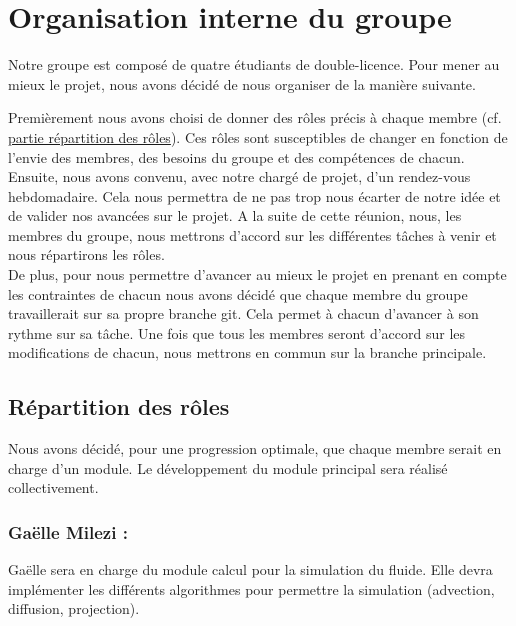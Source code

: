 \documentclass{article}
\begin{document}
   

   

   
   
   \section{Organisation interne du groupe}

   Notre groupe est composé de quatre étudiants de double-licence. Pour mener au mieux le projet, 
   nous avons décidé de nous organiser de la manière suivante.

   Premièrement nous avons choisi de donner des rôles précis à chaque membre 
   (cf. \hyperref[partieroles]{partie répartition des rôles}). Ces rôles sont susceptibles
   de changer en fonction de l'envie des membres, des besoins du groupe et des compétences de chacun. \\
   Ensuite, nous avons convenu, avec notre chargé de projet, d'un rendez-vous hebdomadaire. Cela nous 
   permettra de ne pas trop nous écarter de notre idée et de valider nos avancées sur le projet.
   A la suite de cette réunion, nous, les membres du groupe, nous mettrons d'accord sur les différentes 
   tâches à venir et nous répartirons les rôles. \\
   De plus, pour nous permettre d'avancer au mieux le projet en prenant en compte les contraintes de 
   chacun nous avons décidé que chaque membre du groupe travaillerait sur sa propre branche git. Cela permet à
   chacun d'avancer à son rythme sur sa tâche. Une fois que tous les membres seront d'accord sur les
   modifications de chacun, nous mettrons en commun sur la branche principale. \\

	\subsection{Répartition des rôles}\label{partieroles}
   Nous avons décidé, pour une progression optimale, que chaque membre serait en charge d'un module.
   Le développement du module principal sera réalisé collectivement. 

   \subsubsection*{Gaëlle Milezi :}
   Gaëlle sera en charge du module calcul pour la simulation du fluide.
   Elle devra implémenter les différents algorithmes pour permettre la simulation 
   (advection, diffusion, projection).
   
\end{document}
